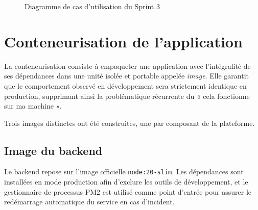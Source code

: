 \begin{figure}[H]
{%
}
\caption{Diagramme de cas d'utilisation du Sprint 3}
\label{fig:uc-sprint3}
\end{figure}

\section{Conteneurisation de l'application}
La conteneurisation consiste à empaqueter une application avec l'intégralité de ses
dépendances dans une unité isolée et portable appelée \textit{image}. Elle garantit que
le comportement observé en développement sera strictement identique en production,
supprimant ainsi la problématique récurrente du « cela fonctionne sur ma machine ».

Trois images distinctes ont été construites, une par composant de la plateforme.

\subsection{Image du backend}
Le backend repose sur l'image officielle \texttt{node:20-slim}. Les dépendances sont
installées en mode production afin d'exclure les outils de développement, et le
gestionnaire de processus PM2 est utilisé comme point d'entrée pour assurer le
redémarrage automatique du service en cas d'incident.

